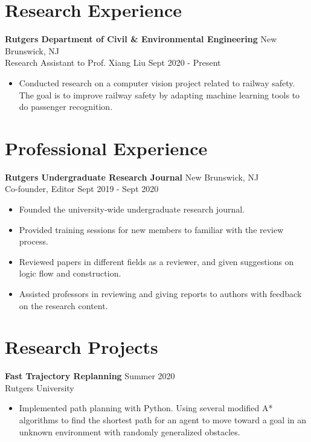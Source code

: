 \documentclass{article}
\begin{document}
\section{Research Experience}
\textbf{Rutgers Department of Civil \& Environmental Engineering}
\hfill{New Brunswick, NJ}\\
Research Assistant to Prof. Xiang Liu
\hfill{Sept 2020 - Present}
\begin{itemize}
  \itemsep0em
  \item Conducted research on a computer vision project related to railway safety.  The goal is to improve railway safety by adapting machine learning tools to do passenger recognition. 
  
\end{itemize}



\section{Professional Experience}
\textbf{Rutgers Undergraduate Research Journal}
\hfill{New Brunswick, NJ}\\
Co-founder, Editor
\hfill{Sept 2019 - Sept 2020}
\begin{itemize}
  \itemsep0em
  \item Founded the university-wide undergraduate research journal.
  \item Provided training sessions for new members to familiar with the review process.
  \item Reviewed papers in different fields as a reviewer, and given suggestions on logic flow and construction.
  \item Assisted professors in reviewing and giving reports to authors with feedback on the research content.
\end{itemize}


\section{Research Projects}
\textbf{Fast Trajectory Replanning}
\hfill{Summer 2020}\\
Rutgers University
\begin{itemize}
  \itemsep0em
  \item Implemented path planning with Python. Using several modified A* algorithms to find the shortest path for an agent to move toward a goal in an unknown environment with randomly generalized obstacles.
\end{itemize}
\end{document}
